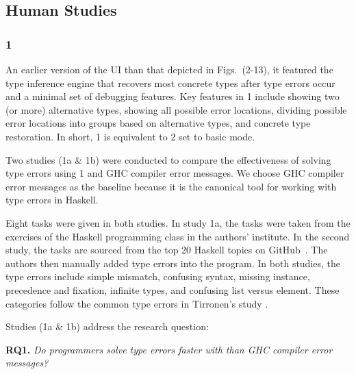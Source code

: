 \subsection{\chameleon{} Human Studies}

\subsubsection{\textbf{\chameleon{} 1}}  
An earlier version of the UI than that depicted in Figs.~(2-13), it featured the type inference engine that recovers most concrete types after type errors occur and a minimal set of debugging features. Key features in \chameleon{} 1 include showing two (or more) alternative types, showing all possible error locations, dividing possible error locations into groups based on alternative types, and concrete type restoration. In short, \chameleon{} 1 is equivalent to \chameleon{} 2 set to basic mode. 


Two  studies (1a \& 1b) were conducted to compare the effectiveness of solving type errors using \chameleon{} 1 and GHC compiler error messages. We choose GHC compiler error messages as the baseline because it is the canonical tool for working with type errors in Haskell.


Eight tasks were given in both studies. In study 1a, the tasks were taken from the exercises of the Haskell programming class in the authors' institute. In the second study, the tasks are sourced from the top 20 Haskell topics on GitHub~\cite{github_github_2022}. The authors then manually added type errors into the program. In both studies, the type errors include simple mismatch, confusing syntax, missing instance, precedence and fixation, infinite types, and confusing list versus element. These categories follow the common type errors in Tirronen's study \cite{tirronen_understanding_2015}. 

Studies (1a \& 1b) address the research question:

\noindent\textbf{RQ1.} \textit{Do programmers solve type errors faster with \chameleon{} than GHC compiler error messages?}


